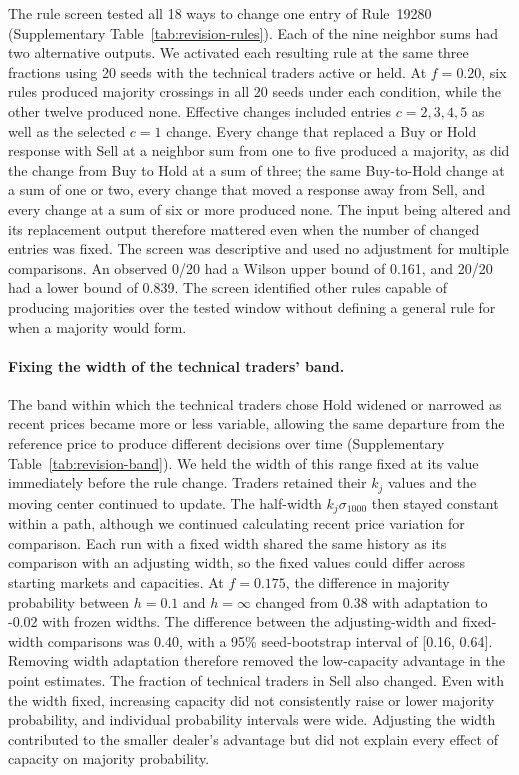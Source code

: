 The rule screen tested all 18 ways to change one entry of Rule~19280
(Supplementary Table~\ref{tab:revision-rules}). Each of the nine
neighbor sums had two alternative outputs. We activated each resulting
rule at the same three fractions using 20 seeds with the technical traders
active or held. At $f=0.20$, six rules produced majority crossings in all 20 seeds
under each condition, while the other twelve produced none. Effective
changes included entries $c=2,3,4,5$ as well as the selected $c=1$
change. Every change that replaced a Buy or Hold response with Sell at
a neighbor sum from one to five produced a majority, as did the change
from Buy to Hold at a sum of three; the same Buy-to-Hold change at a
sum of one or two, every change that moved a response away from Sell,
and every change at a sum of six or more produced none. The input being altered and its replacement output therefore
mattered even when the number of changed entries was fixed. The screen
was descriptive and used no adjustment for multiple comparisons.
An observed 0/20 had a Wilson upper bound of 0.161, and 20/20 had
a lower bound of 0.839. The screen identified other rules capable
of producing majorities over the tested window without defining
a general rule for when a majority would form.

\paragraph{Fixing the width of the technical traders' band.}
The band within which the technical traders chose Hold widened or narrowed as
recent prices became more or less variable, allowing the same departure from
the reference price to produce different decisions over time
(Supplementary Table~\ref{tab:revision-band}). We held the width of this range fixed at its value immediately before
the rule change.
Traders retained their $k_j$ values and the moving center continued to
update. The half-width $k_j\sigma_{1000}$ then stayed constant within
a path, although we continued calculating recent price variation for comparison. Each run with a fixed width shared the same history as its comparison
with an adjusting width, so the fixed values could differ across
starting markets and capacities. At $f=0.175$, the difference in majority probability between $h=0.1$ and $h=\infty$ changed from 0.38 with adaptation
to -0.02 with frozen widths. The difference between the adjusting-width and fixed-width
comparisons was 0.40, with a 95\% seed-bootstrap interval
of [0.16, 0.64]. Removing width adaptation therefore removed
the low-capacity advantage in the point estimates. The fraction of technical traders in Sell also changed. Even with the width
fixed, increasing capacity did not consistently raise or lower majority
probability, and individual probability intervals were wide. Adjusting
the width contributed to the smaller dealer's advantage but did not
explain every effect of capacity on majority probability.

